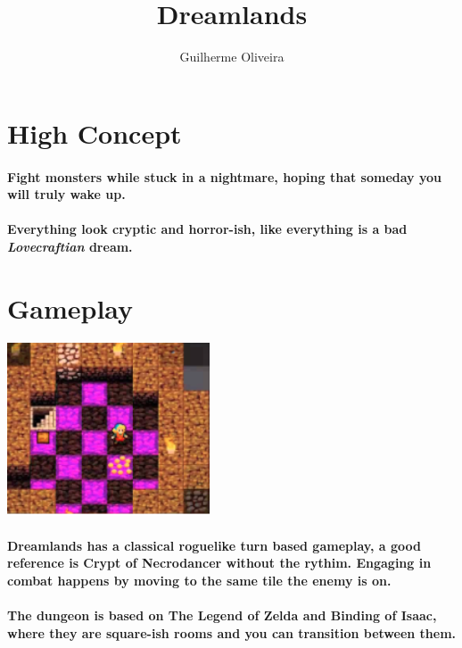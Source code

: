 \documentclass[12pt, twocolumn]{article}
\title{\vspace{-3.0cm}\titlefont Dreamlands}
\author{Guilherme Oliveira}
\date{}
\begin{document}
\maketitle

\section*{High Concept}
\paragraph{Fight monsters while stuck in a nightmare, hoping that someday you will truly wake up.}

\paragraph{Everything look cryptic and horror-ish, like everything is a bad \emph{Lovecraftian} dream.}

\section*{Gameplay}

\begin{center}
\includegraphics[width=6cm]{images/crypt.png}
\end{center}

\paragraph{Dreamlands has a classical roguelike turn based gameplay, a good reference is Crypt of Necrodancer without the rythim. Engaging in combat happens by moving to the same tile the enemy is on.}

\paragraph{The dungeon is based on The Legend of Zelda and Binding of Isaac, where they are square-ish rooms and you can transition between them.}
\end{document}

